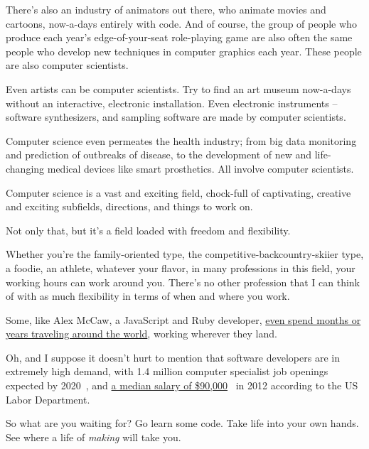 \documentclass[acmtocl]{acmtrans2m}
\begin{document}
There's also an industry of animators out there, who animate movies and
cartoons, now-a-days entirely with code. And of course, the group of people
who produce each year's edge-of-your-seat role-playing game are also often the
same people who develop new techniques in computer graphics each year. These
people are also computer scientists.

Even artists can be computer scientists. Try to find an art museum now-a-days
without an interactive, electronic installation. Even electronic
instruments -- software synthesizers, and sampling software are made by
computer scientists.

Computer science even permeates the health industry; from big data
monitoring and prediction of outbreaks of disease, to the development of new
and life-changing medical devices like smart prosthetics. All involve computer
scientists.

Computer science is a vast and exciting field, chock-full of captivating,
creative and exciting subfields, directions, and things to work on.

Not only that, but it's a field loaded with freedom and flexibility.

Whether you're the family-oriented type, the competitive-backcountry-skiier
type, a foodie, an athlete, whatever your flavor, in many professions in this
field, your working hours can work around you. There's no other profession
that I can think of with as much flexibility in terms of when and where you
work.

Some, like Alex McCaw, a JavaScript and Ruby developer,
\href{http://alexmaccaw.co.uk/posts/traveling\_writing\_programming}{even
spend months or years traveling around the world}, working wherever they land.

Oh, and I suppose it doesn't hurt to mention that software developers are in
extremely high demand, with 1.4 million computer specialist job openings
expected by 2020~\cite{NCWIT}, and \href{http://money.usnews.com/careers/best-
jobs/software-developer/salary}{a median salary of \$90,000}~\cite{USNews} in
2012 according to the US Labor Department.

So what are you waiting for? Go learn some code. Take life into your own
hands. See where a life of \textit{making} will take you.

\end{document}
